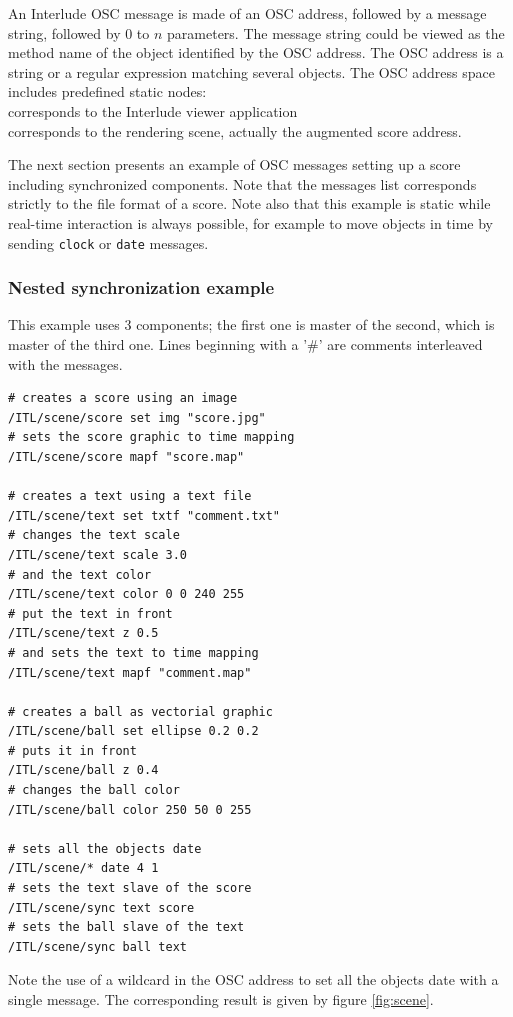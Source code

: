 \documentclass[twoside,10pt]{article}
\newcommand{\osc}[1]			{{\small\texttt{#1}}}
\newcommand{\rshift}			{\hspace*{4mm}}
\begin{document}
An Interlude OSC message is made of an OSC address, followed by a message string, followed by $0$ to $n$ parameters. The message string could be viewed as the method name of the object identified by the OSC address. The OSC address is a string or a regular expression matching several objects.
The OSC address space includes predefined static nodes:\\
\rshift \osc{/ITL} corresponds to the Interlude viewer application \\
\rshift \osc{/ITL/scene} corresponds to the rendering scene, actually the augmented score address.

The next section presents an example of OSC messages setting up a score including synchronized components. Note that the messages list corresponds strictly to the file format of a score. Note also that this example is static while real-time interaction is always possible, for example to move objects in time by sending \osc{clock} or \osc{date} messages.


\subsubsection{Nested synchronization example}

This example uses 3 components; the first one is master of the second, which is master of the third one. Lines beginning with a '\#' are comments interleaved with the messages.

{\small \begin{verbatim}
# creates a score using an image
/ITL/scene/score set img "score.jpg"
# sets the score graphic to time mapping 
/ITL/scene/score mapf "score.map"

# creates a text using a text file
/ITL/scene/text set txtf "comment.txt"
# changes the text scale
/ITL/scene/text scale 3.0
# and the text color
/ITL/scene/text color 0 0 240 255
# put the text in front
/ITL/scene/text z 0.5
# and sets the text to time mapping 
/ITL/scene/text mapf "comment.map"

# creates a ball as vectorial graphic
/ITL/scene/ball set ellipse 0.2 0.2
# puts it in front
/ITL/scene/ball z 0.4
# changes the ball color
/ITL/scene/ball color 250 50 0 255

# sets all the objects date
/ITL/scene/* date 4 1
# sets the text slave of the score
/ITL/scene/sync text score
# sets the ball slave of the text
/ITL/scene/sync ball text
\end{verbatim}
}Note the use of a wildcard in the OSC address to set all the objects date with a single message. 
The corresponding result is given by figure \ref{fig:scene}.
\end{document}

